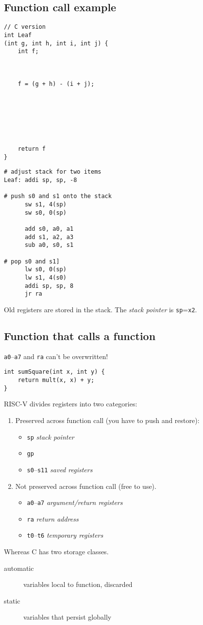 \subsection{Function call example}
\begin{multicols}{2}
\begin{verbatim}
// C version
int Leaf
(int g, int h, int i, int j) {
	int f;
	
	
	
	f = (g + h) - (i + j);
	
	
	
	
	
	
	
	return f
}
\end{verbatim} 
\columnbreak
\begin{verbatim}
# adjust stack for two items
Leaf: addi sp, sp, -8

# push s0 and s1 onto the stack
      sw s1, 4(sp)  
      sw s0, 0(sp)
	  
      add s0, a0, a1
      add s1, a2, a3
      sub a0, s0, s1
	  
# pop s0 and s1]	
      lw s0, 0(sp)
      lw s1, 4(s0)
      addi sp, sp, 8
      jr ra
\end{verbatim}
\end{multicols}

Old registers are stored in the stack. The \emph{stack pointer} is \texttt{sp}=\texttt{x2}.

\subsection{Function that calls a function}
\texttt{a0}--\texttt{a7} and \texttt{ra} can't be overwritten!
\begin{verbatim}
int sumSquare(int x, int y) {
    return mult(x, x) + y;
}
\end{verbatim}

RISC-V divides registers into two categories:
\begin{enumerate}
	\item Preserved across function call (you have to push and restore):
		\begin{itemize}
			\item \texttt{sp} \emph{stack pointer}
			\item \texttt{gp}
			\item \texttt{s0}--\texttt{s11} \emph{saved registers}
		\end{itemize}
	\item Not preserved across function call (free to use). 
		\begin{itemize}
			\item \texttt{a0}--\texttt{a7} \emph{argument/return registers}
			\item \texttt{ra} \emph{return address}
			\item \texttt{t0}--\texttt{t6} \emph{temporary registers}
		\end{itemize}
\end{enumerate}

Whereas C has two storage classes.
\begin{description}
	\item[automatic] variables local to function, discarded
	\item[static] variables that persist globally
\end{description}